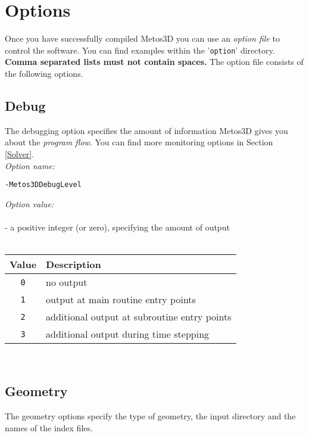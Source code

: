 \documentclass{article}
\begin{document}
%
%
\newpage
\section{Options}

Once you have successfully compiled Metos3D you can use an \emph{option file}
to control the software. You can find examples within the '\texttt{option}'
directory. \textbf{Comma separated lists must not contain spaces.} The option file
consists of the following options.

%
%
\subsection{Debug}

The debugging option specifies the amount of information Metos3D gives you
about the \emph{program flow}. You can find more monitoring options in Section \ref{Solver}. \\

\emph{Option name:}
\begin{verbatim}
-Metos3DDebugLevel
\end{verbatim}

\emph{Option value:} \\
\vspace{-0.3cm}\\
- a positive integer (or zero), specifying the amount of output \\
\\
\begin{tabular}{c|l}
Value & Description \\ \hline
\texttt{0} & no output \\
\texttt{1} & output at main routine entry points \\
\texttt{2} & additional output at subroutine entry points \\
\texttt{3} & additional output during time stepping
\end{tabular} \\

%
%
\subsection{Geometry}

The geometry options specify the type of geometry,
the input directory and the names of the index files. \\
\end{document}
